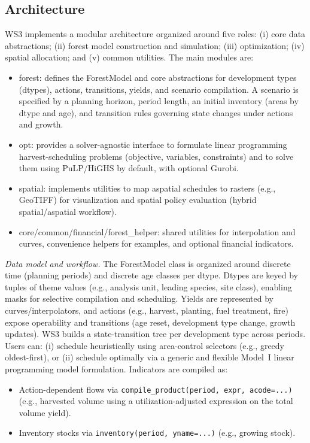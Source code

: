 \documentclass[review]{elsarticle}
\begin{document}
\subsection{Architecture}
WS3 implements a modular architecture organized around five roles: (i) core data abstractions; (ii) forest model construction and simulation; (iii) optimization; (iv) spatial allocation; and (v) common utilities. The main modules are:
\begin{itemize}
  \item forest: defines the ForestModel and core abstractions for development types (dtypes), actions, transitions, yields, and scenario compilation. A scenario is specified by a planning horizon, period length, an initial inventory (areas by dtype and age), and transition rules governing state changes under actions and growth.
  \item opt: provides a solver-agnostic interface to formulate linear programming harvest-scheduling problems (objective, variables, constraints) and to solve them using PuLP/HiGHS by default, with optional Gurobi.
  \item spatial: implements utilities to map aspatial schedules to rasters (e.g., GeoTIFF) for visualization and spatial policy evaluation (hybrid spatial/aspatial workflow).
  \item core/common/financial/forest\_helper: shared utilities for interpolation and curves, convenience helpers for examples, and optional financial indicators.
\end{itemize}

\emph{Data model and workflow.} The ForestModel class is organized around discrete time (planning periods) and discrete age classes per dtype. Dtypes are keyed by tuples of theme values (e.g., analysis unit, leading species, site class), enabling masks for selective compilation and scheduling. Yields are represented by curves/interpolators, and actions (e.g., harvest, planting, fuel treatment, fire) expose operability and transitions (age reset, development type change, growth updates). WS3 builds a state-transition tree per development type across periods. Users can: (i) schedule heuristically using area-control selectors (e.g., greedy oldest-first), or (ii) schedule optimally via a generic and flexible Model~I linear programming model formulation. Indicators are compiled as:
\begin{itemize}
  \item Action-dependent flows via \texttt{compile\_product(period, expr, acode=...)} (e.g., harvested volume using a utilization-adjusted expression on the total volume yield).
  \item Inventory stocks via \texttt{inventory(period, yname=...)} (e.g., growing stock).
\end{itemize}
\end{document}
